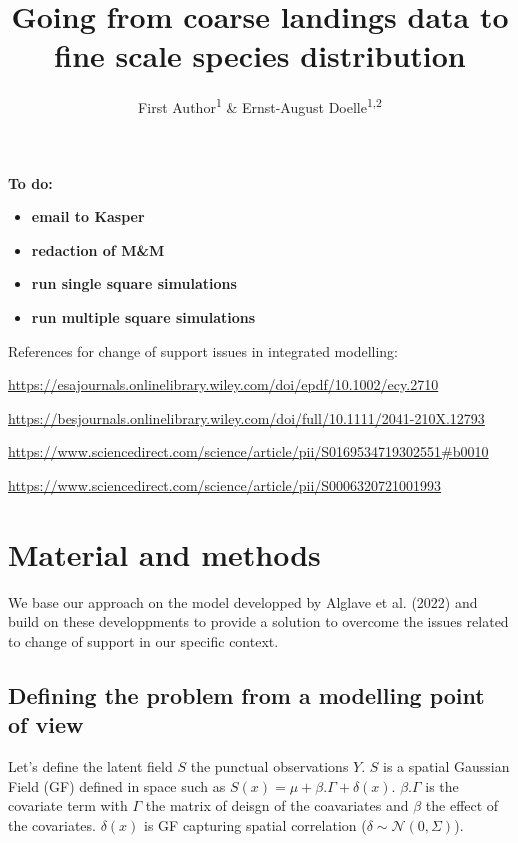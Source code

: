 \documentclass[
  english,
  man]{apa6}
\title{Going from coarse landings data to fine scale species distribution}
\author{First Author\textsuperscript{1} \& Ernst-August Doelle\textsuperscript{1,2}}
\date{}
\affiliation{\vspace{0.5cm}\textsuperscript{1} Wilhelm-Wundt-University\\\textsuperscript{2} Konstanz Business School}
\begin{document}
\maketitle

\textbf{To do:}

\begin{itemize}
\item
  \textbf{email to Kasper}
\item
  \textbf{redaction of M\&M}
\item
  \textbf{run single square simulations}
\item
  \textbf{run multiple square simulations}
\end{itemize}

References for change of support issues in integrated modelling:

\url{https://esajournals.onlinelibrary.wiley.com/doi/epdf/10.1002/ecy.2710}

\url{https://besjournals.onlinelibrary.wiley.com/doi/full/10.1111/2041-210X.12793}

\url{https://www.sciencedirect.com/science/article/pii/S0169534719302551\#b0010}

\url{https://www.sciencedirect.com/science/article/pii/S0006320721001993}

\hypertarget{material-and-methods}{%
\section{Material and methods}\label{material-and-methods}}

We base our approach on the model developped by Alglave et al. (2022) and build on these developpments to provide a solution to overcome the issues related to change of support in our specific context.

\hypertarget{defining-the-problem-from-a-modelling-point-of-view}{%
\subsection{Defining the problem from a modelling point of view}\label{defining-the-problem-from-a-modelling-point-of-view}}

Let's define the latent field \(S\) the punctual observations \(Y\). \(S\) is a spatial Gaussian Field (GF) defined in space such as \(S(x)=\mu+\beta . \Gamma + \delta(x)\). \(\beta . \Gamma\) is the covariate term with \(\Gamma\) the matrix of deisgn of the coavariates and \(\beta\) the effect of the covariates. \(\delta(x)\) is GF capturing spatial correlation (\(\delta \sim \mathcal{N}(0,\Sigma)\)).
\end{document}
